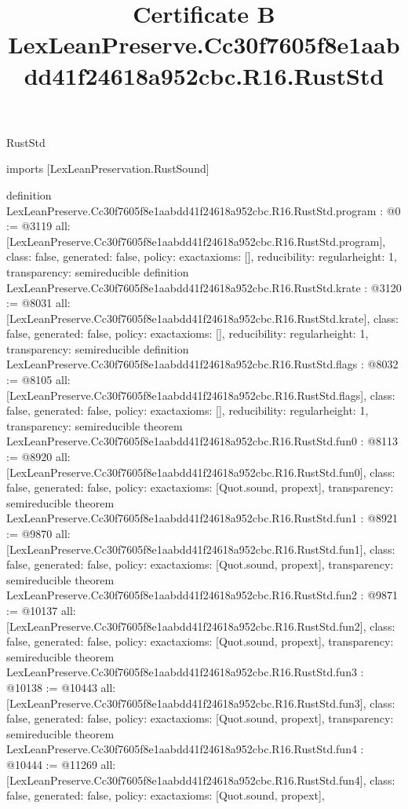 \begin{lexlean}{RustStd}
\title{Certificate B LexLeanPreserve.Cc30f7605f8e1aabdd41f24618a952cbc.R16.RustStd}
\begin{coremodule}
imports [LexLeanPreservation.RustSound]

definition LexLeanPreserve.Cc30f7605f8e1aabdd41f24618a952cbc.R16.RustStd.program : @0 := @3119 {
  all: [LexLeanPreserve.Cc30f7605f8e1aabdd41f24618a952cbc.R16.RustStd.program],
  class: false,
  generated: false,
  policy: exact{axioms: []},
  reducibility: regular{height: 1},
  transparency: semireducible
}
definition LexLeanPreserve.Cc30f7605f8e1aabdd41f24618a952cbc.R16.RustStd.krate : @3120 := @8031 {
  all: [LexLeanPreserve.Cc30f7605f8e1aabdd41f24618a952cbc.R16.RustStd.krate],
  class: false,
  generated: false,
  policy: exact{axioms: []},
  reducibility: regular{height: 1},
  transparency: semireducible
}
definition LexLeanPreserve.Cc30f7605f8e1aabdd41f24618a952cbc.R16.RustStd.flags : @8032 := @8105 {
  all: [LexLeanPreserve.Cc30f7605f8e1aabdd41f24618a952cbc.R16.RustStd.flags],
  class: false,
  generated: false,
  policy: exact{axioms: []},
  reducibility: regular{height: 1},
  transparency: semireducible
}
theorem LexLeanPreserve.Cc30f7605f8e1aabdd41f24618a952cbc.R16.RustStd.fun0 : @8113 := @8920 {
  all: [LexLeanPreserve.Cc30f7605f8e1aabdd41f24618a952cbc.R16.RustStd.fun0],
  class: false,
  generated: false,
  policy: exact{axioms: [Quot.sound, propext]},
  transparency: semireducible
}
theorem LexLeanPreserve.Cc30f7605f8e1aabdd41f24618a952cbc.R16.RustStd.fun1 : @8921 := @9870 {
  all: [LexLeanPreserve.Cc30f7605f8e1aabdd41f24618a952cbc.R16.RustStd.fun1],
  class: false,
  generated: false,
  policy: exact{axioms: [Quot.sound, propext]},
  transparency: semireducible
}
theorem LexLeanPreserve.Cc30f7605f8e1aabdd41f24618a952cbc.R16.RustStd.fun2 : @9871 := @10137 {
  all: [LexLeanPreserve.Cc30f7605f8e1aabdd41f24618a952cbc.R16.RustStd.fun2],
  class: false,
  generated: false,
  policy: exact{axioms: [Quot.sound, propext]},
  transparency: semireducible
}
theorem LexLeanPreserve.Cc30f7605f8e1aabdd41f24618a952cbc.R16.RustStd.fun3 : @10138 := @10443 {
  all: [LexLeanPreserve.Cc30f7605f8e1aabdd41f24618a952cbc.R16.RustStd.fun3],
  class: false,
  generated: false,
  policy: exact{axioms: [Quot.sound, propext]},
  transparency: semireducible
}
theorem LexLeanPreserve.Cc30f7605f8e1aabdd41f24618a952cbc.R16.RustStd.fun4 : @10444 := @11269 {
  all: [LexLeanPreserve.Cc30f7605f8e1aabdd41f24618a952cbc.R16.RustStd.fun4],
  class: false,
  generated: false,
  policy: exact{axioms: [Quot.sound, propext]},
}
\end{coremodule}
\end{lexlean}
